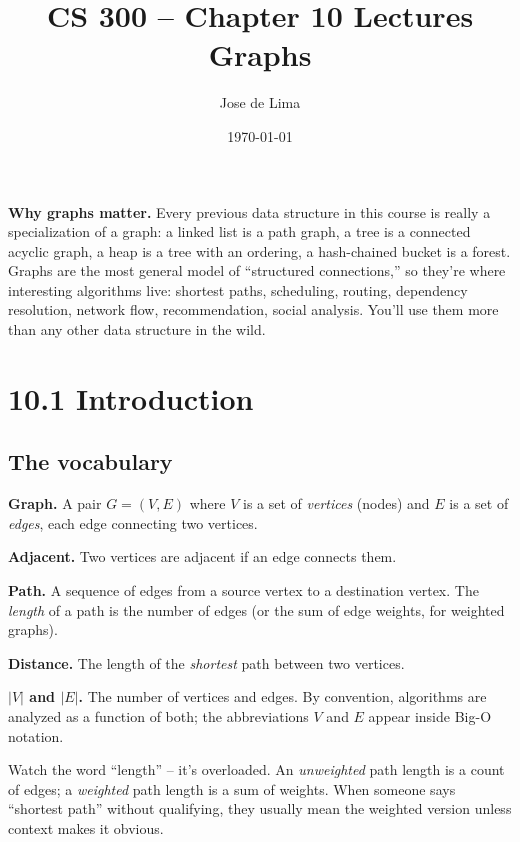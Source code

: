\documentclass[11pt]{article}
\title{CS 300 -- Chapter 10 Lectures\\\large Graphs}
\author{Jose de Lima}
\date{\today}
\begin{document}
\maketitle

\begin{ideabox}
\textbf{Why graphs matter.} Every previous data structure in this course is really a specialization of a graph: a linked list is a path graph, a tree is a connected acyclic graph, a heap is a tree with an ordering, a hash-chained bucket is a forest. Graphs are the most general model of ``structured connections,'' so they're where interesting algorithms live: shortest paths, scheduling, routing, dependency resolution, network flow, recommendation, social analysis. You'll use them more than any other data structure in the wild.
\end{ideabox}

\section{10.1 Introduction}

\subsection*{The vocabulary}

\begin{defnbox}
\textbf{Graph.} A pair $G = (V, E)$ where $V$ is a set of \emph{vertices} (nodes) and $E$ is a set of \emph{edges}, each edge connecting two vertices.

\textbf{Adjacent.} Two vertices are adjacent if an edge connects them.

\textbf{Path.} A sequence of edges from a source vertex to a destination vertex. The \emph{length} of a path is the number of edges (or the sum of edge weights, for weighted graphs).

\textbf{Distance.} The length of the \emph{shortest} path between two vertices.

\textbf{$|V|$ and $|E|$.} The number of vertices and edges. By convention, algorithms are analyzed as a function of both; the abbreviations $V$ and $E$ appear inside Big-O notation.
\end{defnbox}

\begin{notebox}
Watch the word ``length'' -- it's overloaded. An \emph{unweighted} path length is a count of edges; a \emph{weighted} path length is a sum of weights. When someone says ``shortest path'' without qualifying, they usually mean the weighted version unless context makes it obvious.
\end{notebox}
\end{document}
